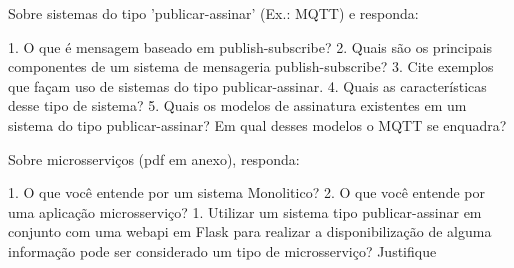 Sobre sistemas do tipo 'publicar-assinar'  (Ex.: MQTT) e responda:

1. O que é mensagem baseado em publish-subscribe?
2. Quais são os principais componentes de um sistema de mensageria publish-subscribe?
3. Cite exemplos que façam uso de sistemas do tipo publicar-assinar.
4. Quais as características desse tipo de sistema?
5. Quais os modelos de assinatura existentes em um sistema do tipo publicar-assinar? Em qual desses modelos o MQTT se enquadra?

Sobre microsserviços (pdf em anexo), responda:

1. O que você entende por um sistema Monolitico?
2. O que você entende por uma aplicação microsserviço?
1. Utilizar um sistema tipo publicar-assinar em conjunto com uma webapi em Flask para realizar a disponibilização de alguma informação pode ser considerado um tipo de microsserviço? Justifique